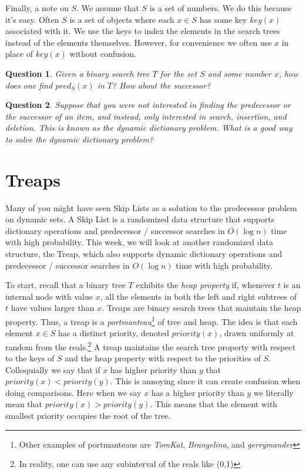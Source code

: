 \documentclass[11pt]{article}
\newtheorem{question}{Question}
\begin{document}
Finally, a note on $S$.  We assume that $S$ is a set of numbers.  We do this because it's easy.  Often $S$ is a set of objects where each $x \in S$ has some key $key(x)$ associated with it.  We use the keys to index the elements in the search trees instead of the elements themselves.  However, for convenience we often use $x$ in place of $key(x)$ without confusion.

\begin{question}
Given a binary search tree $T$ for the set $S$ and some number $x$, how does one find $pred_{S}(x)$ in $T$?  How about the successor?
\end{question}

\begin{question}
Suppose that you were not interested in finding the predecessor or the successor of an item, and instead, only interested in search, insertion, and deletion.  This is known as the {\em dynamic dictionary problem}.  What is a good way to solve the dynamic dictionary problem?
\end{question}

\section{Treaps}

Many of you might have seen Skip Lists as a solution to the predecessor problem on dynamic sets.  A Skip List is a randomized data structure that supports dictionary operations and predecessor / successor searches in $O(\log n)$ time with high probability.  This week, we will look at another randomized data structure, the Treap, which also supports dynamic dictionary operations and predecessor / successor searches in $O(\log n)$ time with high probability.

To start, recall that a binary tree $T$ exhibits the {\em heap property} if, whenever $t$ is an internal node with value $x$, all the elements in both the left and right subtrees of $t$ have values larger than $x$.  Treaps are binary search trees that maintain the heap property.  Thus, a treap is a {\em portmanteau}\footnote{Other examples of portmanteaus are {\em TomKat}, {\em Brangelina}, and {\em gerrymander}} of tree and heap.    The idea is that each element $x \in S$ has a distinct priority, denoted $priority(x)$, drawn uniformly at random from the reals.\footnote{In reality, one can use any subinterval of the reals like (0,1)} A treap maintains the search tree property with respect to the keys of $S$ and the heap property with respect to the priorities of $S$.  Colloquially we say that if $x$ has higher priority than $y$ that $priority(x) < priority(y)$.  This is annoying since it can create confusion when doing comparisons.  Here when we say $x$ has a higher priority than $y$ we literally mean that $priority(x) > priority(y)$.  This means that the element with smallest priority occupies the root of the tree.
\end{document}
